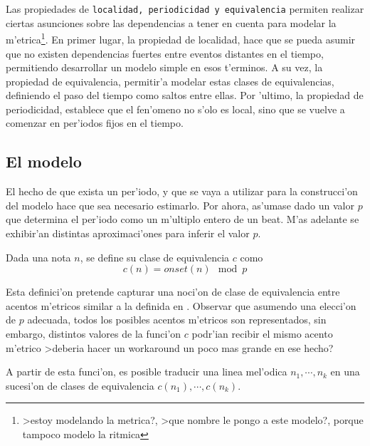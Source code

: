 
Las propiedades de \texttt{localidad, periodicidad y equivalencia} permiten realizar ciertas asunciones sobre las dependencias a tener en cuenta para modelar la 
m'etrica\footnote{>estoy modelando la metrica?, >que nombre le pongo a este modelo?, porque tampoco modelo la ritmica}. En primer lugar, la propiedad de localidad, hace
que se pueda asumir que no existen dependencias fuertes entre eventos distantes en el tiempo, permitiendo desarrollar un modelo simple en esos t'erminos. 
A su vez, la propiedad de equivalencia, permitir'a modelar estas clases de equivalencias, definiendo el paso del tiempo como saltos entre ellas. 
Por 'ultimo, la propiedad de periodicidad, establece que el fen'omeno no s'olo es local, sino que se vuelve a comenzar en per'iodos fijos en el tiempo.

\subsection{El modelo}
El hecho de que exista un per'iodo, y que se vaya a utilizar para la construcci'on del modelo hace que sea necesario estimarlo. Por ahora, as'umase dado un valor 
$p$ que determina el per'iodo como un m'ultiplo entero de un beat. M'as adelante se exhibir'an distintas aproximaci'ones para inferir el valor $p$.

\begin{definition}
Dada una nota $n$, se define su clase de equivalencia $c$ como $$c(n) = onset(n)\mod p$$
\end{definition}

Esta definici'on pretende capturar una noci'on de clase de equivalencia entre acentos m'etricos similar a la definida en \cite{Benjamin84}. Observar que asumendo 
una elecci'on de $p$ adecuada, todos los posibles acentos m'etricos son representados, sin embargo, 
distintos valores de la funci'on $c$ podr'ian recibir el mismo acento m'etrico \alert{>deberia hacer un workaround un poco mas grande en ese hecho?} 


A partir de esta funci'on, es posible traducir una linea mel'odica $n_1,\cdots,n_k$ en una sucesi'on de clases de equivalencia $c(n_1),\cdots,c(n_k)$. 

